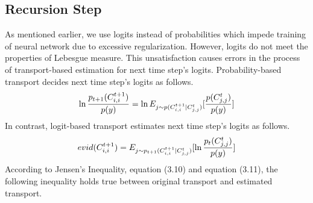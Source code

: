 \subsection{Recursion Step} 
As mentioned earlier, we use logits instead of probabilities  
which impede training of neural network due to excessive regularization.
However, logits do not meet the properties of Lebesgue measure.
This unsatisfaction causes errors in the process of transport-based estimation for next time step’s logits.
Probability-based transport decides next time step's logits as follows. 
\begin{align}
\label{accurate_transport}
\begin{split}
\ln{p_{t+1}(C^{t+1}_{i,i}) \over p(y)}= \ln E_{j\sim p(C^{t+1}_{i,i}|C^t_{j,j})}[{p(C^t_{j,j})\over p(y)}]
\end{split}
\end{align}
In contrast, logit-based transport estimates next time step's logits as follows. 
\begin{align}
\label{estiamted_transport}
\begin{split}
evid(C^{t+1}_{i,i})=E_{j \sim p_{t+1}(C^{t+1}_{i,i}|C^t_{j,j})}[\ln{p_t(C^t_{j,j}) \over p(y)}]
\end{split}
\end{align}
According to Jensen’s Inequality, equation (3.10) and equation (3.11), the following inequality holds true 
between original transport and estimated transport.

